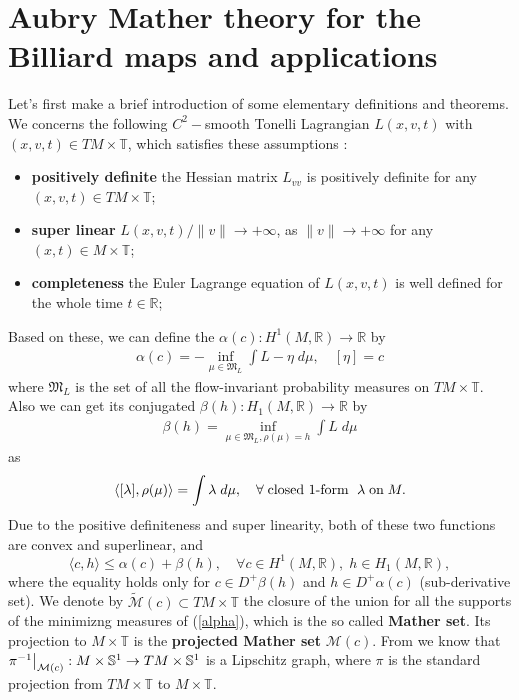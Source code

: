 \documentclass{amsart}
\begin{document}
\section{Aubry Mather theory for the Billiard maps and applications}\label{3}
Let's first make a brief introduction of some elementary definitions and theorems. We concerns the following $C^2-$smooth Tonelli Lagrangian $L(x,v,t)$ with $(x,v,t)\in TM\times{\mathbb{T}}$, which satisfies these assumptions \cite{Ma2}:
\begin{itemize}
\item {\bf positively definite} the Hessian matrix $L_{vv}$ is positively definite for any $(x,v,t)\in TM\times{\mathbb{T}}$;
\item {\bf super linear} $L(x,v,t)/\|v\|\rightarrow+\infty$, as $\|v\|\rightarrow+\infty$ for any $(x,t)\in M\times{\mathbb{T}}$;
\item {\bf completeness} the Euler Lagrange equation of $L(x,v,t)$ is well defined for the whole time $t\in{\mathbb{R}}$;
\end{itemize}
Based on these, we can define the $\alpha(c): H^1(M,{\mathbb{R}})\rightarrow{\mathbb{R}}$ by
\begin{eqnarray}\label{alpha}
\alpha(c)=-\inf_{\mu\in\mathfrak{M}_L}\int L-\eta\; d\mu, \quad[\eta]=c
\end{eqnarray}
where $\mathfrak{M}_L$ is the set of all the flow-invariant probability measures on $TM\times{\mathbb{T}}$. Also we can get its conjugated $\beta(h): H_1(M,{\mathbb{R}})\rightarrow{\mathbb{R}}$ by
\begin{eqnarray}
\beta(h)=\inf_{\mu\in\mathfrak{M}_L, \rho(\mu)=h}\int L\;d\mu
\end{eqnarray}
as
\[
\langle [\lambda], \rho(\mu)\rangle=\int\lambda\;d\mu,\quad\forall \text{\;closed 1-form \;}\lambda \text{\;on\;} M.
\]
Due to the positive definiteness and super linearity, both of these two functions are convex and superlinear, and
\[
\langle c,h\rangle\leq\alpha(c)+\beta(h),\quad\forall c\in H^1(M,{\mathbb{R}}),\; h\in H_1(M,{\mathbb{R}}),
\]
where the equality holds only for $c\in D^+\beta(h)$ and $h\in D^+\alpha(c)$ (sub-derivative set). We denote by $\widetilde{\mathcal{M}}(c)\subset TM\times{\mathbb{T}}$ the closure of the union for all the supports of the minimizng measures of (\ref{alpha}), which is the so called {\bf Mather set}. Its projection to $M\times{\mathbb{T}}$ is the {\bf projected Mather set} $\mathcal{M}(c)$. 
From \cite{Ma2} we know that $\pi^{-1}\big{|}_{\mathcal{M}(c)}:M\times\mathbb{S}^1\rightarrow TM\times\mathbb{S}^1$ is a Lipschitz graph, where $\pi$ is the standard projection from $TM\times{\mathbb{T}}$ to $M\times{\mathbb{T}}$. 
\end{document}
